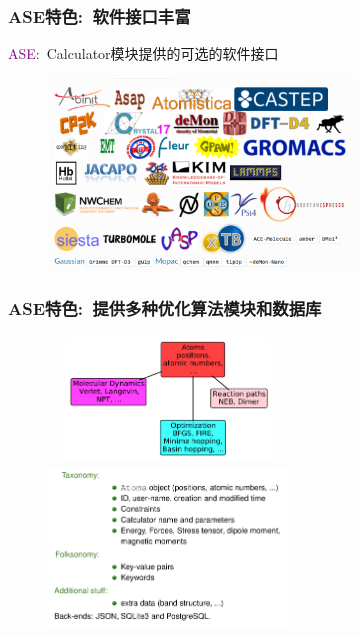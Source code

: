 \documentclass[cjk,slidestop,compress,mathserif,blue]{beamer}
\begin{document}
\frame
{
\frametitle{\textrm{ASE}特色:~软件接口丰富}
\textcolor{purple}{\textrm{ASE}}:~\textrm{Calculator}模块提供的可选的软件接口
\begin{figure}[h!]
\centering
\vspace*{-0.05in}
\includegraphics[height=2.0in,width=3.2in,viewport=0 0 940 600,clip]{Figures/ASE_calculator-new.png}
\caption{\fontsize{7.2pt}{4.2pt}}%
\label{ASE_Calculator}
\end{figure} 
}

\frame
{
\frametitle{\textrm{ASE}特色:~提供多种优化算法模块和数据库}
\begin{figure}[h!]
\centering
\vspace*{-0.18in}
\includegraphics[height=1.3in,width=2.5in,viewport=0 0 838 500,clip]{Figures/ASE_opt_modules.png}
\vskip 1pt
\includegraphics[height=1.7in,width=2.5in,viewport=0 0 938 630,clip]{Figures/ASE_database.png}
\label{ASE_opt-database}
\end{figure} 
}
\end{document}
